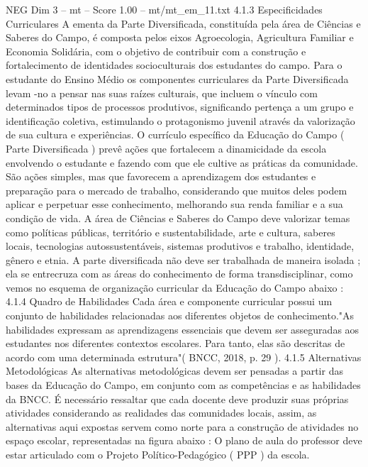 \begin{textsample}{NEG Dim 3 – mt – Score 1.00 – mt/mt\_em\_11.txt}  \label{ex:f3_neg_217}
4.1.3 Especificidades Curriculares A ementa da Parte Diversificada, constituída pela área de Ciências e Saberes do Campo, é composta pelos eixos Agroecologia, Agricultura Familiar e Economia Solidária, com o objetivo de contribuir com a construção e fortalecimento de identidades socioculturais dos estudantes do campo.
Para o estudante do Ensino Médio os componentes curriculares da Parte Diversificada levam -no a pensar nas suas raízes culturais, que incluem o vínculo com determinados tipos de processos produtivos, significando pertença a um grupo e identificação coletiva, estimulando o protagonismo juvenil através da valorização de sua cultura e experiências.
O currículo específico da Educação do Campo ( Parte Diversificada ) prevê ações que fortalecem a dinamicidade da escola envolvendo o estudante e fazendo com que ele cultive as práticas da comunidade.
São ações simples, mas que favorecem a aprendizagem dos estudantes e preparação para o mercado de trabalho, considerando que muitos deles podem aplicar e perpetuar esse conhecimento, melhorando sua renda familiar e a sua condição de vida.
A área de Ciências e Saberes do Campo deve valorizar temas como políticas públicas, território e sustentabilidade, arte e cultura, saberes locais, tecnologias autossustentáveis, sistemas produtivos e trabalho, identidade, gênero e etnia.
A parte diversificada não deve ser trabalhada de maneira isolada ; ela se entrecruza com as áreas do conhecimento de forma transdisciplinar, como vemos no esquema de organização curricular da Educação do Campo abaixo : 4.1.4 Quadro de Habilidades Cada área e componente curricular possui um conjunto de habilidades relacionadas aos diferentes objetos de conhecimento."As habilidades expressam as aprendizagens essenciais que devem ser asseguradas aos estudantes nos diferentes contextos escolares.
Para tanto, elas são descritas de acordo com uma determinada estrutura"( BNCC, 2018, p. 29 ). 4.1.5 Alternativas Metodológicas As alternativas metodológicas devem ser pensadas a partir das bases da Educação do Campo, em conjunto com as competências e as habilidades da BNCC.
É necessário ressaltar que cada docente deve produzir suas próprias atividades considerando as realidades das comunidades locais, assim, as alternativas aqui expostas servem como norte para a construção de atividades no espaço escolar, representadas na figura abaixo : O plano de aula do professor deve estar articulado com o Projeto Político-Pedagógico ( PPP ) da escola.

\end{textsample}
